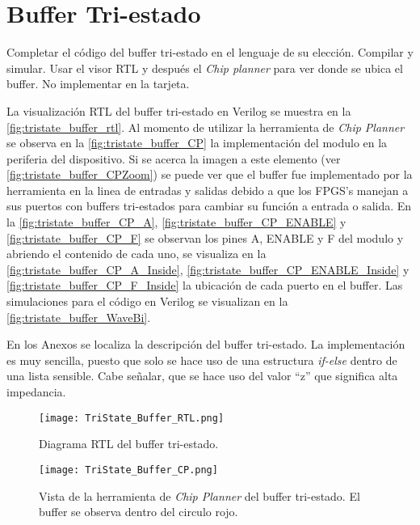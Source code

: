 \section{Buffer Tri-estado \label{sec:s4}}

\begin{center}
	\begin{minipage}{12cm}
		\begin{tcolorbox}[title=Actividad 4]
			Completar el código del buffer tri-estado en el lenguaje de su elección. Compilar y simular. Usar el visor RTL y después el \textit{Chip planner} para ver donde se ubica el buffer. No implementar en la tarjeta.
		\end{tcolorbox}	
	\end{minipage}
\end{center}

La visualización RTL del buffer tri-estado en Verilog se muestra en la \autoref{fig:tristate_buffer_rtl}. Al momento de utilizar la herramienta de \textit{Chip Planner} se observa en la \autoref{fig:tristate_buffer_CP} la implementación del modulo en la periferia del dispositivo. Si se acerca la imagen a este elemento (ver \autoref{fig:tristate_buffer_CPZoom}) se puede ver que el buffer fue implementado por la herramienta en la linea de entradas y salidas debido a que los FPGS's manejan a sus puertos con buffers tri-estados para cambiar su función a entrada o salida. En la \autoref{fig:tristate_buffer_CP_A}, \autoref{fig:tristate_buffer_CP_ENABLE} y \autoref{fig:tristate_buffer_CP_F} se observan los pines A, ENABLE y F del modulo y abriendo el contenido de cada uno, se visualiza en la \autoref{fig:tristate_buffer_CP_A_Inside}, \autoref{fig:tristate_buffer_CP_ENABLE_Inside} y \autoref{fig:tristate_buffer_CP_F_Inside} la ubicación de cada puerto en el buffer. Las simulaciones para el código en Verilog se visualizan en la \autoref{fig:tristate_buffer_WaveBi}.

En los Anexos se localiza la descripción del buffer tri-estado. La implementación es muy sencilla, puesto que solo se hace uso de una estructura \textit{if-else} dentro de una lista sensible. Cabe señalar, que se hace uso del valor ``z'' que significa alta impedancia.

\begin{figure}[ht]
	\centering
	\texttt{[image: TriState\_Buffer\_RTL.png]}
	\caption{Diagrama RTL del buffer tri-estado. \label{fig:tristate_buffer_rtl}}
\end{figure}

\begin{figure}[ht]
	\centering
	\texttt{[image: TriState\_Buffer\_CP.png]}
	\caption{Vista de la herramienta de \textit{Chip Planner} del buffer tri-estado. El buffer se observa dentro del circulo rojo. \label{fig:tristate_buffer_CP}}
\end{figure}

